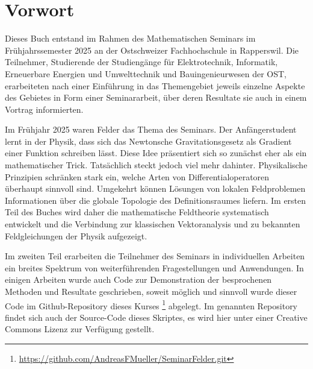 %
%
%
\chapter*{Vorwort}


Dieses Buch entstand im Rahmen des Mathematischen Seminars
im Frühjahrssemester 2025 an der Ostschweizer Fachhochschule in Rapperswil.
Die Teilnehmer, Studierende der Studiengänge für Elektrotechnik, Informatik,
Erneuerbare Energien und Umwelttechnik und Bauingenieurwesen
der OST, erarbeiteten nach einer Einführung in das Themengebiet jeweils
einzelne Aspekte des Gebietes in Form einer Seminararbeit, über
deren Resultate sie auch in einem Vortrag informierten. 

Im Frühjahr 2025 waren Felder das Thema des Seminars.
Der Anfängerstudent lernt in der Physik, dass sich das Newtonsche
Gravitationsgesetz als Gradient einer Funktion schreiben lässt.
Diese Idee präsentiert sich so zunächst eher als ein mathematischer
Trick.
Tatsächlich steckt jedoch viel mehr dahinter.
Physikalische Prinzipien schränken stark ein, welche Arten von
Differentialoperatoren überhaupt sinnvoll sind.
Umgekehrt können Lösungen von lokalen Feldproblemen Informationen
über die globale Topologie des Definitionsraumes liefern.
Im ersten Teil des Buches wird daher die mathematische Feldtheorie
systematisch entwickelt und die Verbindung zur klassischen
Vektoranalysis und zu bekannten Feldgleichungen der Physik aufgezeigt.

Im zweiten Teil erarbeiten die Teilnehmer des Seminars in individuellen
Arbeiten ein breites Spektrum von weiterführenden Fragestellungen
und Anwendungen.
In einigen Arbeiten wurde auch Code zur Demonstration der 
besprochenen Methoden und Resultate geschrieben, soweit
möglich und sinnvoll wurde dieser Code im Github-Repository
%
dieses Kurses%
\footnote{\url{https://github.com/AndreasFMueller/SeminarFelder.git}}
\cite{buch:repo}
abgelegt.
Im genannten Repository findet sich auch der Source-Code dieses
Skriptes, es wird hier unter einer Creative Commons Lizenz
zur Verfügung gestellt.

